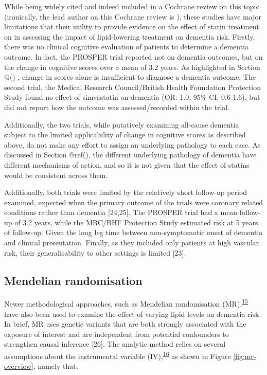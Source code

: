 \documentclass[a4paper, twoside]{templates/ociamthesis}
\begin{document}
While being widely cited and indeed included in a Cochrane review on this topic (ironically, the lead author on this Cochrane review is ), these studies have major limitations that their utility to provide evidence on the effect of statin treatment on in assessing the impact of lipid-lowering treatment on dementia risk. Firstly, there was no clinical cognitive evaluation of patients to determine a dementia outcome. In fact, the PROSPER trial reported not on dementia outcomes, but on the change in cognitive scores over a mean of 3.2 years. As highlighted in Section @() , change in scores alone is insufficient to diagnose a dementia outcome. The second trial, the Medical Research Council/British Health Foundation Protection Study found no effect of simvastatin on dementia (OR: 1.0, 95\% CI: 0.6-1.6), but did not report how the outcome was assessed/recorded within the trial.

Additionally, the two trials, while putatively examining all-cause dementia subject to the limited applicability of change in cognitive scores as described above, do not make any effort to assign an underlying pathology to each case. As discussed in Section @ref(), the different underlying pathology of dementia have different mechanisms of action, and so it is not given that the effect of statins would be consistent across them.

Additionally, both trials were limited by the relatively short follow-up period examined, expected when the primary outcome of the trials were coronary related conditions rather than dementia {[}24,25{]}. The PROSPER trial had a mean follow-up of 3.2 years, while the MRC/BHF Protection Study estimated risk at 5 years of follow-up. Given the long leg time between non-symptomatic onset of dementia and clinical presentation. Finally, as they included only patients at high vascular risk, their generalisability to other settings is limited {[}23{]}.

\hypertarget{mendelian-randomisation}{%
\subsection{Mendelian randomisation}\label{mendelian-randomisation}}

Newer methodological approaches, such as Mendelian randomisation (MR),\textsuperscript{\protect\hyperlink{ref-daveysmith2014}{15}} have also been used to examine the effect of varying lipid levels on dementia risk. In brief, MR uses genetic variants that are both strongly associated with the exposure of interest and are independent from potential confounders to strengthen causal inference {[}26{]}. The analytic method relies on several assumptions about the instrumental variable (IV),\textsuperscript{\protect\hyperlink{ref-davies2018}{16}} as shown in Figure \ref{fig:mr-overview}, namely that:
\end{document}
